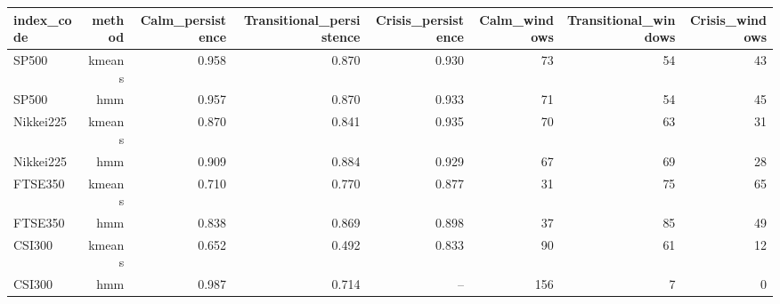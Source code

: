\begin{tabular}{lrrrrrrr}
\toprule
index\_code & method & Calm\_persistence & Transitional\_persistence & Crisis\_persistence & Calm\_windows & Transitional\_windows & Crisis\_windows \\
\midrule
SP500 & kmeans & 0.958 & 0.870 & 0.930 & 73 & 54 & 43 \\
SP500 & hmm & 0.957 & 0.870 & 0.933 & 71 & 54 & 45 \\
Nikkei225 & kmeans & 0.870 & 0.841 & 0.935 & 70 & 63 & 31 \\
Nikkei225 & hmm & 0.909 & 0.884 & 0.929 & 67 & 69 & 28 \\
FTSE350 & kmeans & 0.710 & 0.770 & 0.877 & 31 & 75 & 65 \\
FTSE350 & hmm & 0.838 & 0.869 & 0.898 & 37 & 85 & 49 \\
CSI300 & kmeans & 0.652 & 0.492 & 0.833 & 90 & 61 & 12 \\
CSI300 & hmm & 0.987 & 0.714 & -- & 156 & 7 & 0 \\
\bottomrule
\end{tabular}
